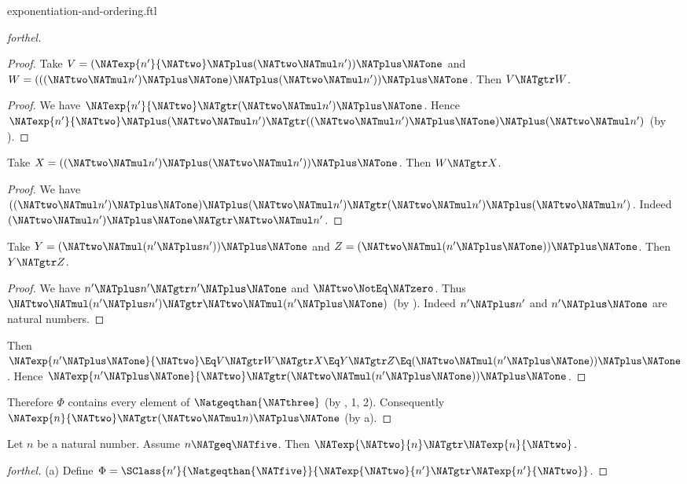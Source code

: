 \documentclass{stex}
\begin{document}
\begin{smodule}{exponentiation-and-ordering.ftl}
\begin{proof}[forthel]
\begin{proof}
    Take $V = (\NATexp{n'}{\NATtwo} \NATplus (\NATtwo \NATmul n')) \NATplus \NATone$ and $W = (((\NATtwo \NATmul n') \NATplus \NATone) \NATplus (\NATtwo \NATmul n')) \NATplus \NATone$.
    Then $V \NATgtr W$.
    \begin{proof}
      We have $\NATexp{n'}{\NATtwo} \NATgtr (\NATtwo \NATmul n') \NATplus \NATone$.
      Hence $\NATexp{n'}{\NATtwo} \NATplus (\NATtwo \NATmul n') \NATgtr ((\NATtwo \NATmul n') \NATplus \NATone) \NATplus (\NATtwo \NATmul n')$ (by ).
    \end{proof}

    Take $X = ((\NATtwo \NATmul n') \NATplus (\NATtwo \NATmul n')) \NATplus \NATone$.
    Then $W \NATgtr X$.
    \begin{proof}
      We have $((\NATtwo \NATmul n') \NATplus \NATone) \NATplus (\NATtwo \NATmul n') \NATgtr (\NATtwo \NATmul n') \NATplus (\NATtwo \NATmul n')$.
      Indeed $(\NATtwo \NATmul n') \NATplus \NATone \NATgtr \NATtwo \NATmul n'$.
    \end{proof}

    Take $Y = (\NATtwo \NATmul (n' \NATplus n')) \NATplus \NATone$ and $Z = (\NATtwo \NATmul (n' \NATplus \NATone)) \NATplus \NATone$.
    Then $Y \NATgtr Z$.
    \begin{proof}
      We have $n' \NATplus n' \NATgtr n' \NATplus \NATone$ and $\NATtwo \NotEq \NATzero$.
      Thus $\NATtwo \NATmul (n' \NATplus n') \NATgtr \NATtwo \NATmul (n' \NATplus \NATone)$ (by ).
      Indeed $n' \NATplus n'$ and $n' \NATplus \NATone$ are natural numbers.
    \end{proof}

    Then $\NATexp{n' \NATplus \NATone}{\NATtwo} \Eq V \NATgtr W \NATgtr X \Eq Y \NATgtr Z \Eq (\NATtwo \NATmul (n' \NATplus \NATone)) \NATplus \NATone$.
    Hence $\NATexp{n' \NATplus \NATone}{\NATtwo} \NATgtr (\NATtwo \NATmul (n' \NATplus \NATone)) \NATplus \NATone$.
  \end{proof}

  Therefore $\Phi$ contains every element of $\Natgeqthan{\NATthree}$ (by , 1, 2).
  Consequently $\NATexp{n}{\NATtwo} \NATgtr (\NATtwo \NATmul n) \NATplus \NATone$ (by a).
\end{proof}

\begin{proposition}[forthel]
  Let $n$ be a natural number.
  Assume $n \NATgeq \NATfive$.
  Then $\NATexp{\NATtwo}{n} \NATgtr \NATexp{n}{\NATtwo}$.
\end{proposition}
\begin{proof}[forthel]
  (a) Define $\Phi = \SClass{n'}{\Natgeqthan{\NATfive}}{\NATexp{\NATtwo}{n'} \NATgtr \NATexp{n'}{\NATtwo}}$.


\end{proof}
\end{smodule}
\end{document}
